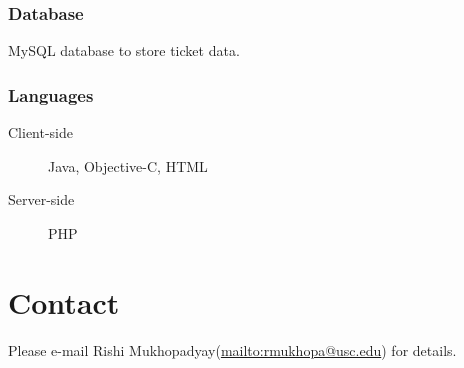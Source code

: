 \documentclass{article}
\begin{document}
			\subsubsection{Database}
				MySQL database to store ticket data.
			\subsubsection{Languages}
				\begin{description}
					\item[Client-side] Java, Objective-C, HTML
					\item[Server-side] PHP
				\end{description}
	
\section{Contact}
Please e-mail Rishi Mukhopadyay(\url{mailto:rmukhopa@usc.edu}) for details.
\end{document}

